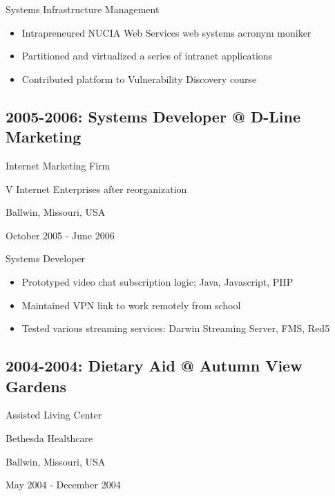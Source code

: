 \documentclass[letter,,openany,oneside,english]{sphinxhowto}
\begin{document}
Systems Infrastructure Management
\begin{itemize}
\item {} 
Intrapreneured \sphinxquotedblleft{}NUCIA Web Services\sphinxquotedblright{} web systems acronym moniker

\item {} 
Partitioned and virtualized a series of intranet applications

\item {} 
Contributed platform to Vulnerability Discovery course

\end{itemize}


\subsection{2005-2006: Systems Developer @ D-Line Marketing}
\label{\detokenize{resume:systems-developer-d-line-marketing}}
\begin{DUlineblock}{0em}
\item[] Internet Marketing Firm
\item[] V Internet Enterprises after reorganization
\item[] Ballwin, Missouri, USA
\item[] October 2005 - June 2006
\end{DUlineblock}

Systems Developer
\begin{itemize}
\item {} 
Prototyped video chat subscription logic; Java, Javascript, PHP

\item {} 
Maintained VPN link to work remotely from school

\item {} 
Tested various streaming services: Darwin Streaming Server, FMS, Red5

\end{itemize}


\subsection{2004-2004: Dietary Aid @ Autumn View Gardens}
\label{\detokenize{resume:dietary-aid-autumn-view-gardens}}
\begin{DUlineblock}{0em}
\item[] Assisted Living Center
\item[] Bethesda Healthcare
\item[] Ballwin, Missouri, USA
\item[] May 2004 - December 2004
\end{DUlineblock}
\end{document}
